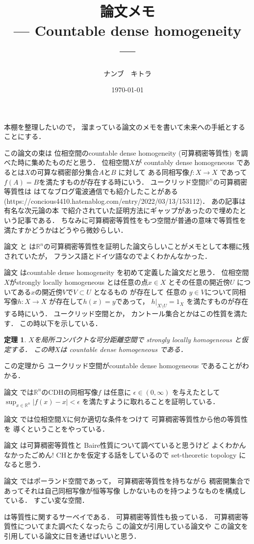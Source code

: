 \documentclass[leqno, a4paper, 12pt]{jsarticle}
\title{論文メモ
\large{\\--- Countable dense homogeneity ---}
}
\author{ナンブ　キトラ}
\date{\today}
\newtheorem{thm}{定理}
\newcommand{\rr}{\mathbb{R}}
\begin{document}
\maketitle

本棚を整理したいので，
溜まっている論文のメモを書いて未来への手紙とすることにする．

この論文の束は
位相空間のcountable dense homogeneity 
(可算稠密等質性)
を調べた時に集めたものだと思う．
位相空間$X$が
countably dense homogeneous 
であるとは$X$の可算な稠密部分集合$A$と$B$
に対して
ある同相写像$f\colon X\to X$
であって$f(A)=B$を満たすものが存在する時にいう．
ユークリッド空間$\rr^{n}$の可算稠密等質性は
はてなブログ電波通信でも紹介したことがある
(https://concious4410.hatenablog.com/entry/2022/03/13/153112)．
あの記事は
有名な次元論の本
\cite{MR0006493}
で紹介されていた証明方法にギャップがあったので埋めたという記事である．
ちなみに可算稠密等質性をもつ空間が普通の意味で等質性を満たすかどうかはどうやら微妙らしい．


論文
\cite{MR1580864}
と
\cite{MR1511557}
は$\rr^{n}$の可算稠密等質性を証明した論文らしいことがメモとして本棚に残されていたが，
フランス語とドイツ語なのでよくわかんなかった．

論文
\cite{MR0301711}
はcountable dense homogeneity 
を初めて定義した論文だと思う．
位相空間$X$がstrongly locally homogeneous 
とは任意の点$x\in X$
とその任意の開近傍$U$
についてある$x$の開近傍$V$で$V\subset U$
となるもの
が存在して
任意の
$y\in V$について同相写像$h\colon X\to X$
が存在して$h(x)=y$であって，
$h|_{X\setminus U}=1_{X}$
を満たすものが存在する時にいう．
ユークリッド空間とか， 
カントール集合とかはこの性質を満たす．
この時以下を示している．
\begin{thm}
$X$を局所コンパクトな可分距離空間で
strongly locally homogeneous
と仮定する．
この時$X$は
countable dense homogeneous 
である．
\end{thm}
この定理から
ユークリッド空間がcountable dense 
homogeneous 
であることがわかる．


論文
\cite{MR0203711}
では$\rr^{n}$のCDHの同相写像$f$
は任意に
$\epsilon\in (0, \infty)$
を与えたとして
$\sup_{x\in \rr^{n}} |f(x)-x|<\epsilon$
を満たすように取れることを証明している．

論文
\cite{MR0482626}
では位相空間$X$に何か適切な条件をつけて
可算稠密等質性から他の等質性を
導くということをやっている．

論文
\cite{MR1141367}
は可算稠密等質性と
Baire性質について調べていると思うけど
よくわかんなかったごめん!
CHとかを仮定する話をしているので
set-theoretic topology
になると思う．


論文\cite{MR2439024}
ではポーランド空間であって，
可算稠密等質性を持ちながら
稠密開集合であってそれは自己同相写像が恒等写像
しかないものを持つようなものを構成している．
すごい変な空間．


\cite{MR1020771}
は等質性に関するサーベイである．
可算稠密等質性も扱っている．
可算稠密等質性についてまた調べたくなったら
この論文が引用している論文や
この論文を引用している論文に目を通せばいいと思う．


\nocite{*}


\end{document}
